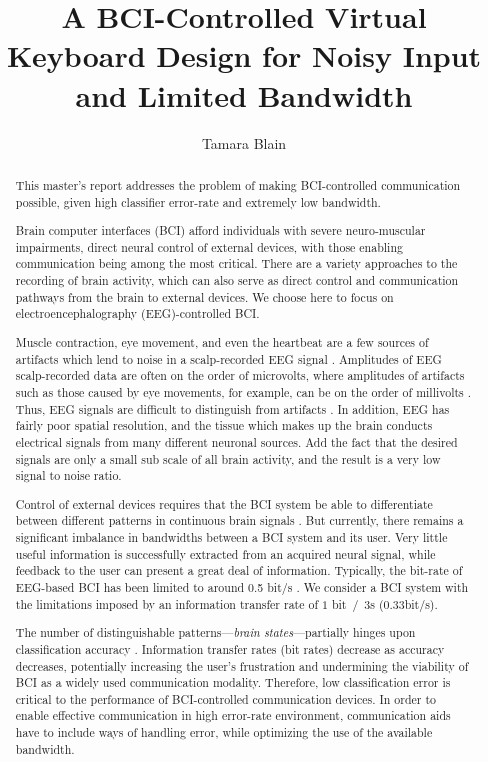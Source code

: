 \documentclass[12pt,titlepage]{article}
\begin{document}
\title{A BCI-Controlled Virtual Keyboard Design for Noisy Input and Limited Bandwidth} %
\author{Tamara Blain}
\maketitle

\begin{abstract}
This master's report addresses the problem of making BCI-controlled communication possible, given high classifier error-rate and extremely low bandwidth.

Brain computer interfaces (BCI) afford individuals with severe neuro-muscular impairments, direct neural control of external devices, with those enabling communication being among the most critical.  There are a variety approaches to the recording of brain activity, which can also serve as direct control and communication pathways from the brain to external devices.  We choose here to focus on electroencephalography (EEG)-controlled BCI.

Muscle contraction, eye movement, and even the heartbeat are a few sources of artifacts which lend to noise in a scalp-recorded EEG signal \cite{nunez_electric_2005}.  Amplitudes of EEG scalp-recorded data are often on the order of microvolts, where amplitudes of artifacts such as those caused by eye movements, for example, can be on the order of millivolts \cite{tatum2007handbook}.  Thus, EEG signals are difficult to distinguish from artifacts \cite{nunez_electric_2005}.  In addition, EEG has fairly poor spatial resolution, and the tissue which makes up the brain conducts electrical signals from many 
different neuronal sources.  Add the fact that the desired signals are only a small sub scale of all 
brain activity, and the result is a very low signal to noise ratio.

Control of external devices requires that the BCI system be able to differentiate between different patterns in continuous brain signals \cite{lotte_review_2007}.  But currently, there remains a significant imbalance in bandwidths between a BCI system and its user.  Very little useful information is successfully extracted from an acquired neural signal, while feedback to the user can present a 
great deal of information.  Typically, the bit-rate of EEG-based BCI has been limited to around 0.5 bit/s \cite{millan2004}.  We consider a BCI system with the limitations imposed by an information transfer rate of $1$ bit~$/$~$3$s (0.33bit/s).

The number of distinguishable patterns---\emph{brain states}---partially hinges upon classification 
accuracy \cite{lotte_review_2007}.  Information transfer rates (bit rates) decrease as accuracy decreases, potentially increasing the user's frustration and  undermining the viability of BCI as a widely used communication modality.  Therefore, low classification error is critical to the performance of BCI-controlled communication devices.  In order to enable effective communication in high error-rate environment, communication aids have to include ways of handling error, while optimizing the use of the available bandwidth.


\end{abstract}
\end{document}
